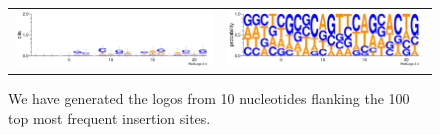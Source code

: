 \documentclass[12pt,letterpaper]{article}
\begin{document}
\begin{figure}
\begin{tabular}{c c}
\includegraphics[scale=0.55]{100logo-bits.pdf}&
\includegraphics[scale=0.55]{100logo-prob.pdf}
\end{tabular}
\caption{We have generated the logos from 10 nucleotides flanking the 100 top most frequent insertion sites.}
\label{fig:logos}
\end{figure}
\end{document}
